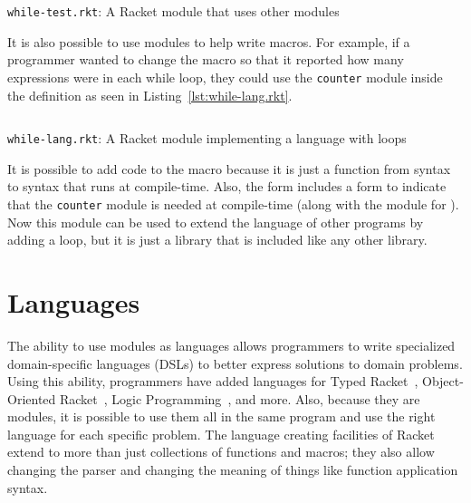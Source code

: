 \begin{listing}
  \inputminted{racket}{listings/while-test.rkt}
  \caption{\texttt{while-test.rkt}: A Racket module that uses other modules}
  \label{lst:while-test.rkt}
\end{listing}

It is also possible to use modules to help write macros.
For example, if a programmer wanted to change the  macro so that it reported how many expressions were in each while loop, they could use the \texttt{counter} module inside the  definition as seen in Listing~\ref{lst:while-lang.rkt}.
\begin{listing}
  \inputminted{racket}{listings/while-lang.rkt}
  \caption{\texttt{while-lang.rkt}: A Racket module implementing a language with  loops}
  \label{lst:while-lang.rkt}
\end{listing}
It is possible to add code to the  macro because it is just a function from syntax to syntax that runs at compile-time. 
Also, the  form includes a  form to indicate that the \texttt{counter} module is needed at compile-time (along with the  module for ).
Now this module can be used to extend the language of other programs by adding a  loop, but it is just a library that is included like any other library.

\section{Languages}
The ability to use modules as languages allows programmers to write specialized domain-specific languages (DSLs) to better express solutions to domain problems. 
Using this ability, programmers have added languages for Typed Racket~\cite{typed}, Object-Oriented Racket~\cite{oo}, Logic Programming~\cite{logic}, and more.
Also, because they are modules, it is possible to use them all in the same program and use the right language for each specific problem.
The language creating facilities of Racket extend to more than just collections of functions and macros; they also allow changing the parser and changing the meaning of things like function application syntax. 


